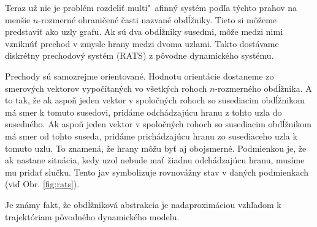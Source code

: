 \documentclass[11pt,final,oneside]{fithesis}
\begin{document}
Teraz u\v z nie je probl\'em rozdeli\v t multi"~afinn\'y syst\'em pod\v la t\'ychto prahov na men\v sie $n$-rozmern\'e ohrani\v cen\'e \v casti nazvan\'e 
obd\'l\v zniky. Tieto si m\^ o\v zeme predstavi\v t ako uzly grafu. Ak s\'u dva obd\'l\v zniky susedmi, m\^ o\v ze medzi nimi vznikn\'u\v t prechod v zmysle
hrany medzi dvoma uzlami. Takto dost\'avame diskr\'etny prechodov\'y syst\'em (RATS) z p\^ ovodne dynamick\'eho syst\'emu. 

Prechody s\'u samozrejme orientovan\'e. Hodnotu orient\'acie dostaneme zo smerov\'ych vektorov vypo\v c\'itan\'ych vo v\v setk\'ych rohoch $n$-rozmern\'eho 
obd\'l\v znika. A to tak, \v ze ak aspo\v n jeden vektor v spolo\v cn\'ych rohoch so susediacim obd\'l\v znikom m\'a smer k tomuto susedovi, prid\'ame 
odch\'adzaj\'ucu hranu z tohto uzla do susedn\'eho. Ak aspo\v n jeden vektor v spolo\v cn\'ych rohoch so susediacim obd\'l\v znikom m\'a smer od tohto
suseda, prid\'ame prich\'adzaj\'ucu hranu zo susediaceho uzla k tomuto uzlu. To znamen\'a, \v ze hrany m\^ o\v zu by\v t aj obojsmern\'e. Podmienkou je, \v ze
ak nastane situ\'acia, kedy uzol nebude ma\v t \v ziadnu odch\'adzaj\'ucu hranu, mus\'ime mu prida\v t slu\v cku. Tento jav symbolizuje rovnov\'a\v zny stav
v dan\'ych podmienkach (vi\v d Obr. \ref{fig:rats}). 

Je zn\'amy fakt, \v ze obd\'l\v znikov\'a abstrakcia je nadaproxim\'aciou vzh\v ladom k trajekt\'oriam p\^ ovodn\'eho dynamick\'eho modelu.
\cite{BIODIVINE}
\end{document}
